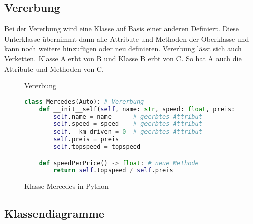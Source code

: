 \subsection{Vererbung}

Bei der Vererbung wird eine Klasse auf Basis einer anderen Definiert.
Diese Unterklasse übernimmt dann alle Attribute und Methoden der Oberklasse
und kann noch weitere hinzufügen oder neu definieren. Vererbung lässt sich auch
Verketten. Klasse A erbt von B und Klasse B erbt von C. So hat A auch die Attribute
und Methoden von C.


\vspace*{0.5cm}
\begin{figure}[H]
\begin{center}
    \caption{Vererbung}
\end{center}
\end{figure}

\begin{figure}
\begin{lstlisting}[language=python]
class Mercedes(Auto): # Vererbung
    def __init__self(self, name: str, speed: float, preis: Ganzahl, topspeed: Dezimalzahl):
        self.name = name      # geerbtes Attribut
        self.speed = speed    # geerbtes Attribut
        self.__km_driven = 0  # geerbtes Attribut
        self.preis = preis
        self.topspeed = topspeed

    def speedPerPrice() -> float: # neue Methode
        return self.topspeed / self.preis
\end{lstlisting}
\caption{Klasse Mercedes in Python}
\end{figure}

\subsection{Klassendiagramme}

